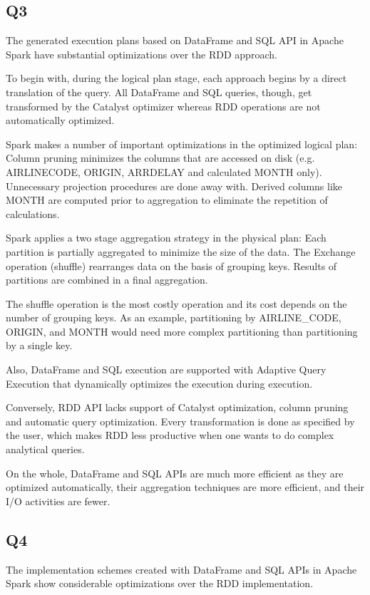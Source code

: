 \documentclass{article}
\begin{document}
\subsection{Q3}
The generated execution plans based on DataFrame and SQL API in Apache Spark have substantial optimizations over the RDD approach.

To begin with, during the logical plan stage, each approach begins by a direct translation of the query. All DataFrame and SQL queries, though, get transformed by the Catalyst optimizer whereas RDD operations are not automatically optimized.

Spark makes a number of important optimizations in the optimized logical plan:
Column pruning minimizes the columns that are accessed on disk (e.g. AIRLINECODE, ORIGIN, ARRDELAY and calculated MONTH only).
Unnecessary projection procedures are done away with.
Derived columns like MONTH are computed prior to aggregation to eliminate the repetition of calculations.

Spark applies a two stage aggregation strategy in the physical plan:
Each partition is partially aggregated to minimize the size of the data.
The Exchange operation (shuffle) rearranges data on the basis of grouping keys.
Results of partitions are combined in a final aggregation.

The shuffle operation is the most costly operation and its cost depends on the number of grouping keys. As an example, partitioning by AIRLINE\_CODE, ORIGIN, and MONTH would need more complex partitioning than partitioning by a single key.

Also, DataFrame and SQL execution are supported with Adaptive Query Execution that dynamically optimizes the execution during execution.

Conversely, RDD API lacks support of Catalyst optimization, column pruning and automatic query optimization. Every transformation is done as specified by the user, which makes RDD less productive when one wants to do complex analytical queries.

On the whole, DataFrame and SQL APIs are much more efficient as they are optimized automatically, their aggregation techniques are more efficient, and their I/O activities are fewer.
\subsection{Q4}
The implementation schemes created with DataFrame and SQL APIs in Apache Spark show considerable optimizations over the RDD implementation.
\end{document}
